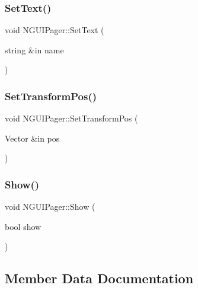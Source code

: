 \subsubsection{\texorpdfstring{Set\+Text()}{SetText()}}
{\footnotesize\ttfamily void N\+G\+U\+I\+Pager\+::\+Set\+Text (\begin{DoxyParamCaption}\item[{string \&in}]{name }\end{DoxyParamCaption})}

\hypertarget{class_n_g_u_i_pager_a3b73a40998208d9931cb185659a7c90c}{}\label{class_n_g_u_i_pager_a3b73a40998208d9931cb185659a7c90c} 
\subsubsection{\texorpdfstring{Set\+Transform\+Pos()}{SetTransformPos()}}
{\footnotesize\ttfamily void N\+G\+U\+I\+Pager\+::\+Set\+Transform\+Pos (\begin{DoxyParamCaption}\item[{Vector \&in}]{pos }\end{DoxyParamCaption})}

\hypertarget{class_n_g_u_i_pager_a1eb1701225878ba653aaa4b336760c3d}{}\label{class_n_g_u_i_pager_a1eb1701225878ba653aaa4b336760c3d} 
\subsubsection{\texorpdfstring{Show()}{Show()}}
{\footnotesize\ttfamily void N\+G\+U\+I\+Pager\+::\+Show (\begin{DoxyParamCaption}\item[{bool}]{show }\end{DoxyParamCaption})}



\subsection{Member Data Documentation}
\hypertarget{class_n_g_u_i_pager_afe0846d828eda7f2b9612eb18c4bb7b5}{}\label{class_n_g_u_i_pager_afe0846d828eda7f2b9612eb18c4bb7b5} 

